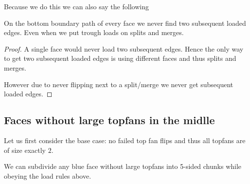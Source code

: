 Because we do this we can also say the following

\begin{lemma}
  \label{lm:}
  On the bottom boundary path of every face we never find two subsequent loaded edges. Even when we put trough loads on splits and merges.
\end{lemma}
\begin{proof}
  A single face would never load two subsequent edges. Hence the only way to get two subsequent loaded edges is using different faces and thus splits and merges.

  However due to never flipping next to a split/merge we never get subsequent loaded edges.
\end{proof}


\subsection{Faces without large topfans in the midlle}
Let us first consider the base case: no failed top fan flips and thus all topfans are of size exactly $2$.

\begin{lemma}
  \label{lm:subdiv:withoutTopfan}
  We can subdivide any blue face without large topfans into 5-sided chunks while obeying the load rules above.
\end{lemma}

